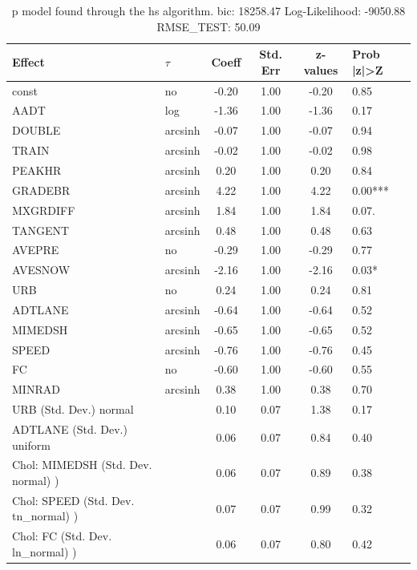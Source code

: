 \begin{table}
	\caption{p model found through the hs algorithm. bic: 18258.47 Log-Likelihood: -9050.88 RMSE_TEST: 50.09}
	\begin{center}
		\begin{tabular}{|l|l|c|c|c|l|}
			\hline
			Effect & $\tau$ & Coeff & Std. Err & z-values & Prob |z|>Z \\
			\hline
			const & no & -0.20 & 1.00 & -0.20 & 0.85 \\
			\hline
			AADT & log & -1.36 & 1.00 & -1.36 & 0.17 \\
			\hline
			DOUBLE & arcsinh & -0.07 & 1.00 & -0.07 & 0.94 \\
			\hline
			TRAIN & arcsinh & -0.02 & 1.00 & -0.02 & 0.98 \\
			\hline
			PEAKHR & arcsinh & 0.20 & 1.00 & 0.20 & 0.84 \\
			\hline
			GRADEBR & arcsinh & 4.22 & 1.00 & 4.22 & 0.00*** \\
			\hline
			MXGRDIFF & arcsinh & 1.84 & 1.00 & 1.84 & 0.07. \\
			\hline
			TANGENT & arcsinh & 0.48 & 1.00 & 0.48 & 0.63 \\
			\hline
			AVEPRE & no & -0.29 & 1.00 & -0.29 & 0.77 \\
			\hline
			AVESNOW & arcsinh & -2.16 & 1.00 & -2.16 & 0.03* \\
			\hline
			URB & no & 0.24 & 1.00 & 0.24 & 0.81 \\
			\hline
			ADTLANE & arcsinh & -0.64 & 1.00 & -0.64 & 0.52 \\
			\hline
			MIMEDSH & arcsinh & -0.65 & 1.00 & -0.65 & 0.52 \\
			\hline
			SPEED & arcsinh & -0.76 & 1.00 & -0.76 & 0.45 \\
			\hline
			FC & no & -0.60 & 1.00 & -0.60 & 0.55 \\
			\hline
			MINRAD & arcsinh & 0.38 & 1.00 & 0.38 & 0.70 \\
			\hline
			URB (Std. Dev.) normal &  & 0.10 & 0.07 & 1.38 & 0.17 \\
			\hline
			ADTLANE (Std. Dev.) uniform &  & 0.06 & 0.07 & 0.84 & 0.40 \\
			\hline
			 Chol: MIMEDSH (Std. Dev. normal) ) &  & 0.06 & 0.07 & 0.89 & 0.38 \\
			\hline
			 Chol: SPEED (Std. Dev. tn_normal) ) &  & 0.07 & 0.07 & 0.99 & 0.32 \\
			\hline
			 Chol: FC (Std. Dev. ln_normal) ) &  & 0.06 & 0.07 & 0.80 & 0.42 \\

\end{tabular}
\end{center}
\end{table}

